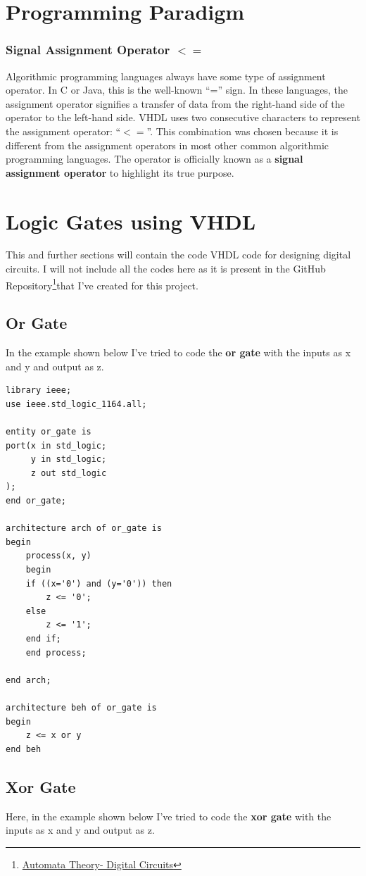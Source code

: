 \documentclass{report}
\begin{document}
\section{Programming Paradigm}
\subsubsection{Signal Assignment Operator $<=$}
Algorithmic programming languages always have some type of assignment
operator. In C or Java, this is the well-known “=” sign. In these languages, the assignment operator signifies a transfer of data from the right-hand side of the operator to the left-hand side. VHDL uses two consecutive characters to represent the assignment operator: “$<=$”. This combination was chosen because it is different from the assignment operators in most other common algorithmic programming languages. The operator is officially known as a \textbf{signal assignment operator} to highlight its true purpose.
\section{Logic Gates using VHDL}
This and further sections will contain the code VHDL code for designing digital circuits. I will not include all the codes here as it is present in the GitHub Repository\footnote{\href{https://github.com/Liza23/Summer-of-Science_Automata-Theory}{Automata Theory- Digital Circuits}}that I've created for this project.
\subsection{Or Gate}
In the example shown below I've tried to code the \textbf{or gate} with the inputs as x and y and output as z. 
\begin{verbatim}
library ieee;
use ieee.std_logic_1164.all;

entity or_gate is
port(x in std_logic;
     y in std_logic;
     z out std_logic
);
end or_gate;

architecture arch of or_gate is
begin
	process(x, y)
	begin
	if ((x='0') and (y='0')) then
		z <= '0';
	else 
		z <= '1';
	end if;
	end process;

end arch;

architecture beh of or_gate is
begin
	z <= x or y
end beh
\end{verbatim}

\subsection{Xor Gate}
Here, in the example shown below I've tried to code the \textbf{xor gate} with the inputs as x and y and output as z. 
\end{document}
